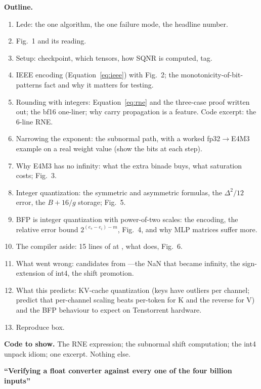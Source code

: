 \begin{blogbox}
\textbf{Outline.}
\begin{enumerate}
  \item Lede: the one algorithm, the one failure mode, the headline number.
  \item Fig.~1 and its reading.
  \item Setup: checkpoint, which tensors, how SQNR is computed, tag.
  \item IEEE encoding (Equation~\eqref{eq:ieee}) with Fig.~2; the monotonicity-of-bit-patterns fact and why it matters for testing.
  \item Rounding with integers: Equation~\eqref{eq:rne} and the three-case proof written out; the bf16 one-liner; why carry propagation is a feature. Code excerpt: the 6-line RNE.
  \item Narrowing the exponent: the subnormal path, with a worked fp32$\to$E4M3 example on a real weight value (show the bits at each step).
  \item Why E4M3 has no infinity: what the extra binade buys, what saturation costs; Fig.~3.
  \item Integer quantization: the symmetric and asymmetric formulas, the $\Delta^2/12$ error, the $B+16/g$ storage; Fig.~5.
  \item BFP is integer quantization with power-of-two scales: the encoding, the relative error bound $2^{(e_s-e_i)-m}$, Fig.~4, and why MLP matrices suffer more.
  \item The compiler aside: 15 lines of  at , what  does, Fig.~6.
  \item What went wrong: candidates from ---the NaN that became infinity, the sign-extension of int4, the  shift promotion.
  \item What this predicts: KV-cache quantization (keys have outliers per channel; predict that per-channel scaling beats per-token for K and the reverse for V) and the BFP behaviour to expect on Tenstorrent hardware.
  \item Reproduce box.
\end{enumerate}

\textbf{Code to show.} The RNE expression; the subnormal shift computation; the int4 unpack idiom; one  excerpt. Nothing else.

 \textbf{``Verifying a float converter against every one of the four billion inputs''}


\end{blogbox}
